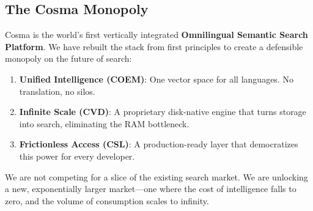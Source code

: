 \subsection{The Cosma Monopoly}

Cosma is the world's first vertically integrated \textbf{Omnilingual Semantic Search Platform}. We have rebuilt the stack from first principles to create a defensible monopoly on the future of search:

\begin{enumerate}[noitemsep]
    \item \textbf{Unified Intelligence (COEM)}: One vector space for all languages. No translation, no silos.
    \item \textbf{Infinite Scale (CVD)}: A proprietary disk-native engine that turns storage into search, eliminating the RAM bottleneck.
    \item \textbf{Frictionless Access (CSL)}: A production-ready layer that democratizes this power for every developer.
\end{enumerate}

We are not competing for a slice of the existing search market. We are unlocking a new, exponentially larger market—one where the cost of intelligence falls to zero, and the volume of consumption scales to infinity.
